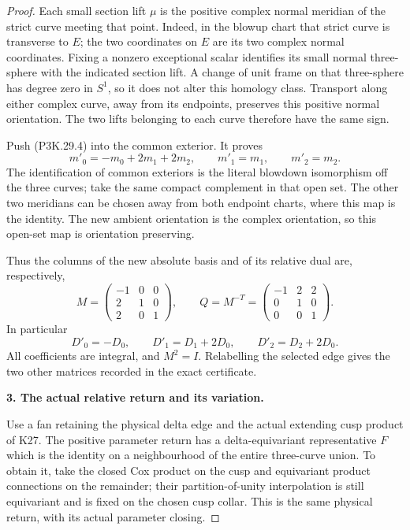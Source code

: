 \begin{proof}
Each small section lift \(\mu\) is the positive complex normal
meridian of the strict curve meeting that point. Indeed, in the
blowup chart that strict curve is transverse to \(E\); the two
coordinates on \(E\) are its two complex normal coordinates.
Fixing a nonzero exceptional scalar identifies its small normal
three-sphere with the indicated section lift. A change of unit
frame on that three-sphere has degree zero in \(S^1\), so it
does not alter this homology class. Transport along either
complex curve, away from its endpoints, preserves this positive
normal orientation. The two lifts belonging to each curve
therefore have the same sign.

Push (P3K.29.4) into the common exterior. It proves
\[
        m'_0=-m_0+2m_1+2m_2,\qquad
        m'_1=m_1,\qquad m'_2=m_2.                        \tag{P3K.29.5}
\]
The identification of common exteriors is the literal blowdown
isomorphism off the three curves; take the same compact
complement in that open set. The other two meridians can be
chosen away from both endpoint charts, where this map is the
identity. The new ambient orientation is the complex orientation,
so this open-set map is orientation preserving.

Thus the columns of the new absolute basis and of its relative
dual are, respectively,
\[
 M=
 \begin{pmatrix}-1&0&0\\2&1&0\\2&0&1\end{pmatrix},
 \qquad
 Q=M^{-T}=
 \begin{pmatrix}-1&2&2\\0&1&0\\0&0&1\end{pmatrix}.
                                                        \tag{P3K.29.6}
\]
In particular
\[
              D'_0=-D_0,\qquad
              D'_1=D_1+2D_0,\qquad
              D'_2=D_2+2D_0.                           \tag{P3K.29.7}
\]
All coefficients are integral, and \(M^2=I\). Relabelling
the selected edge gives the two other matrices recorded in
the exact certificate.

\par\medskip\noindent\textbf{3. The actual relative return and its variation.}\enspace

Use a fan retaining the physical delta edge and the actual
extending cusp product of K27. The positive parameter return
has a delta-equivariant representative \(F\) which is the
identity on a neighbourhood of the entire three-curve union.
To obtain it, take the closed Cox product on the cusp and
equivariant product connections on the remainder; their
partition-of-unity interpolation is still equivariant and is
fixed on the chosen cusp collar. This is the same physical
return, with its actual parameter closing.


\end{proof}
